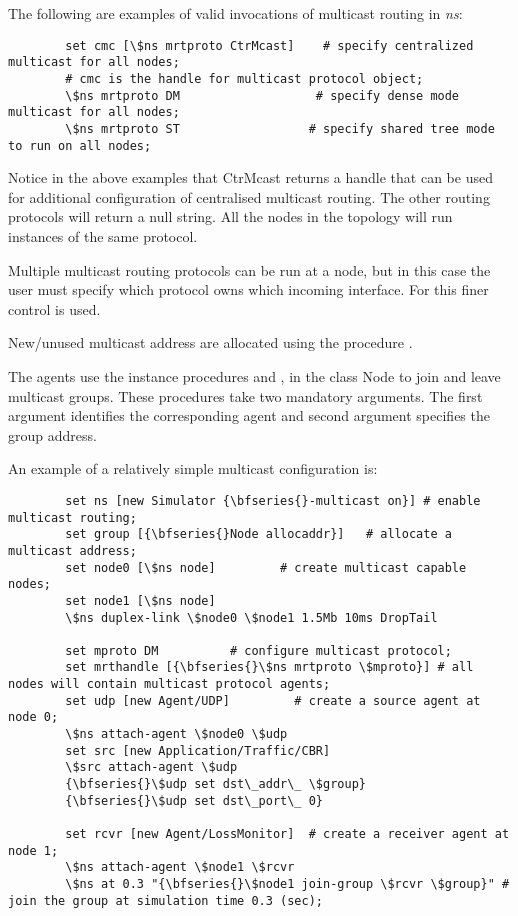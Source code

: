 The following are examples of valid
invocations of multicast routing in \emph{ns}:
\begin{verbatim}
        set cmc [\$ns mrtproto CtrMcast]    # specify centralized multicast for all nodes;
        # cmc is the handle for multicast protocol object;
        \$ns mrtproto DM                   # specify dense mode multicast for all nodes;
        \$ns mrtproto ST                  # specify shared tree mode to run on all nodes;
\end{verbatim}
Notice in the above examples that CtrMcast returns a handle that can
be used for additional configuration of centralised multicast routing.
The other routing protocols will return a null string.  All the
nodes in the topology will run instances of the same protocol.

Multiple multicast routing protocols can be run at a node, but in this
case the user must specify which protocol owns which incoming
interface.  For this finer control  is used.

New/unused multicast address are allocated using the procedure
.

The agents use the instance procedures
 and , in
the class Node to join and leave multicast groups. These procedures
take two mandatory arguments. The first argument identifies the
corresponding agent and second argument specifies the group address.

An example of a relatively simple multicast configuration is:
\begin{verbatim}
        set ns [new Simulator {\bfseries{}-multicast on}] # enable multicast routing;
        set group [{\bfseries{}Node allocaddr}]   # allocate a multicast address;
        set node0 [\$ns node]         # create multicast capable nodes;
        set node1 [\$ns node]
        \$ns duplex-link \$node0 \$node1 1.5Mb 10ms DropTail

        set mproto DM          # configure multicast protocol;
        set mrthandle [{\bfseries{}\$ns mrtproto \$mproto}] # all nodes will contain multicast protocol agents;
        set udp [new Agent/UDP]         # create a source agent at node 0;
        \$ns attach-agent \$node0 \$udp 
        set src [new Application/Traffic/CBR]        
        \$src attach-agent \$udp
        {\bfseries{}\$udp set dst\_addr\_ \$group}
        {\bfseries{}\$udp set dst\_port\_ 0}

        set rcvr [new Agent/LossMonitor]  # create a receiver agent at node 1;
        \$ns attach-agent \$node1 \$rcvr
        \$ns at 0.3 "{\bfseries{}\$node1 join-group \$rcvr \$group}" # join the group at simulation time 0.3 (sec);
\end{verbatim} %

